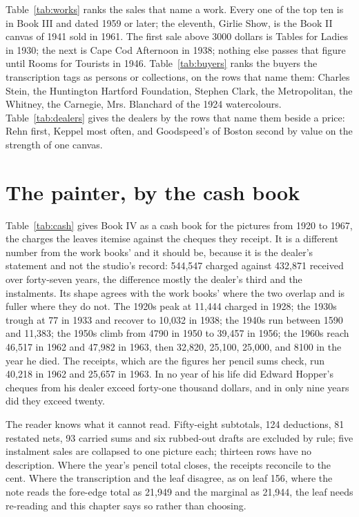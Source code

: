 Table~\ref{tab:works} ranks the sales that name a work. Every one of the top ten is in Book III and dated 1959 or later; the eleventh, Girlie Show, is the Book II canvas of 1941 sold in 1961. The first sale above 3000 dollars is Tables for Ladies in 1930; the next is Cape Cod Afternoon in 1938; nothing else passes that figure until Rooms for Tourists in 1946. Table~\ref{tab:buyers} ranks the buyers the transcription tags as persons or collections, on the rows that name them: Charles Stein, the Huntington Hartford Foundation, Stephen Clark, the Metropolitan, the Whitney, the Carnegie, Mrs. Blanchard of the 1924 watercolours. Table~\ref{tab:dealers} gives the dealers by the rows that name them beside a price: Rehn first, Keppel most often, and Goodspeed's of Boston second by value on the strength of one canvas.

\section{The painter, by the cash book}

Table~\ref{tab:cash} gives Book IV as a cash book for the pictures from 1920 to 1967, the charges the leaves itemise against the cheques they receipt. It is a different number from the work books' and it should be, because it is the dealer's statement and not the studio's record: 544,547 charged against 432,871 received over forty-seven years, the difference mostly the dealer's third and the instalments. Its shape agrees with the work books' where the two overlap and is fuller where they do not. The 1920s peak at 11,444 charged in 1928; the 1930s trough at 77 in 1933 and recover to 10,032 in 1938; the 1940s run between 1590 and 11,383; the 1950s climb from 4790 in 1950 to 39,457 in 1956; the 1960s reach 46,517 in 1962 and 47,982 in 1963, then 32,820, 25,100, 25,000, and 8100 in the year he died. The receipts, which are the figures her pencil sums check, run 40,218 in 1962 and 25,657 in 1963. In no year of his life did Edward Hopper's cheques from his dealer exceed forty-one thousand dollars, and in only nine years did they exceed twenty.

The reader knows what it cannot read. Fifty-eight subtotals, 124 deductions, 81 restated nets, 93 carried sums and six rubbed-out drafts are excluded by rule; five instalment sales are collapsed to one picture each; thirteen rows have no description. Where the year's pencil total closes, the receipts reconcile to the cent. Where the transcription and the leaf disagree, as on leaf 156, where the note reads the fore-edge total as 21,949 and the marginal as 21,944, the leaf needs re-reading and this chapter says so rather than choosing.

